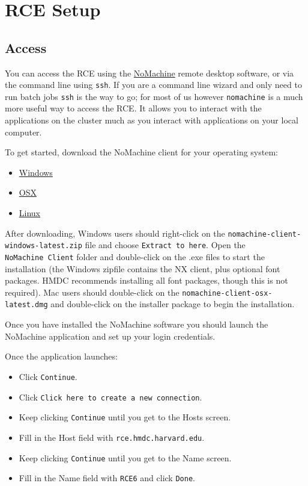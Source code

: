 \documentclass[]{book}
\providecommand{\tightlist}{%
  \setlength{\itemsep}{0pt}\setlength{\parskip}{0pt}}
\begin{document}
\chapter{RCE Setup}\label{rce-setup}

\section{Access}\label{access}

You can access the RCE using the
\href{http://projects.iq.harvard.edu/rce/nx4_installation}{NoMachine}
remote desktop software, or via the command line using \texttt{ssh}. If
you are a command line wizard and only need to run batch jobs
\texttt{ssh} is the way to go; for most of us however \texttt{nomachine}
is a much more useful way to access the RCE. It allows you to interact
with the applications on the cluster much as you interact with
applications on your local computer.

To get started, download the NoMachine client for your operating system:

\begin{itemize}
\tightlist
\item
  \href{http://downloads.hmdc.harvard.edu/nx/4/nomachine-client-windows-latest.zip}{Windows}
\item
  \href{http://downloads.hmdc.harvard.edu/nx/4/nomachine-client-osx-latest.dmg}{OSX}
\item
  \href{http://downloads.hmdc.harvard.edu/nx/4/nomachine-client-linux-latest.zip}{Linux}
\end{itemize}

After downloading, Windows users should right-click on the
\texttt{nomachine-client-windows-latest.zip} file and choose
\texttt{Extract\ to\ here}. Open the \texttt{NoMachine\ Client} folder
and double-click on the .exe files to start the installation (the
Windows zipfile contains the NX client, plus optional font packages.
HMDC recommends installing all font packages, though this is not
required). Mac users should double-click on the
\texttt{nomachine-client-osx-latest.dmg} and double-click on the
installer package to begin the installation.

Once you have installed the NoMachine software you should launch the
NoMachine application and set up your login credentials.

Once the application launches:

\begin{itemize}
\tightlist
\item
  Click \texttt{Continue}.
\item
  Click \texttt{Click\ here\ to\ create\ a\ new\ connection}.
\item
  Keep clicking \texttt{Continue} until you get to the Hosts screen.
\item
  Fill in the Host field with \texttt{rce.hmdc.harvard.edu}.
\item
  Keep clicking \texttt{Continue} until you get to the Name screen.
\item
  Fill in the Name field with \texttt{RCE6} and click \texttt{Done}.
\end{itemize}
\end{document}
